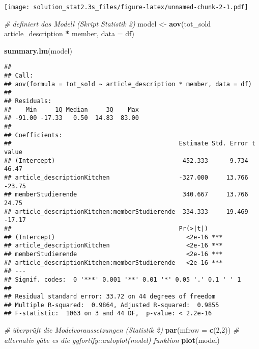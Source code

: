 \documentclass[
]{article}
\newenvironment{Shaded}{\begin{snugshade}}{\end{snugshade}}
\newcommand{\CommentTok}[1]{\textcolor[rgb]{0.56,0.35,0.01}{\textit{#1}}}
\newcommand{\DataTypeTok}[1]{\textcolor[rgb]{0.13,0.29,0.53}{#1}}
\newcommand{\DecValTok}[1]{\textcolor[rgb]{0.00,0.00,0.81}{#1}}
\newcommand{\KeywordTok}[1]{\textcolor[rgb]{0.13,0.29,0.53}{\textbf{#1}}}
\newcommand{\NormalTok}[1]{#1}
\newcommand{\OperatorTok}[1]{\textcolor[rgb]{0.81,0.36,0.00}{\textbf{#1}}}
\newcommand{\StringTok}[1]{\textcolor[rgb]{0.31,0.60,0.02}{#1}}
\begin{document}
\texttt{[image: solution\_stat2.3s\_files/figure-latex/unnamed-chunk-2-1.pdf]}

\begin{Shaded}
\begin{Highlighting}[]
\CommentTok{# definiert das Modell (Skript Statistik 2)}
\NormalTok{model <-}\StringTok{ }\KeywordTok{aov}\NormalTok{(tot_sold }\OperatorTok{~}\StringTok{ }\NormalTok{article_description }\OperatorTok{*}\StringTok{ }\NormalTok{member, }\DataTypeTok{data =}\NormalTok{ df)}

\KeywordTok{summary.lm}\NormalTok{(model)}
\end{Highlighting}
\end{Shaded}

\begin{verbatim}
## 
## Call:
## aov(formula = tot_sold ~ article_description * member, data = df)
## 
## Residuals:
##    Min     1Q Median     3Q    Max 
## -91.00 -17.33   0.50  14.83  83.00 
## 
## Coefficients:
##                                              Estimate Std. Error t value
## (Intercept)                                   452.333      9.734   46.47
## article_descriptionKitchen                   -327.000     13.766  -23.75
## memberStudierende                             340.667     13.766   24.75
## article_descriptionKitchen:memberStudierende -334.333     19.469  -17.17
##                                              Pr(>|t|)    
## (Intercept)                                    <2e-16 ***
## article_descriptionKitchen                     <2e-16 ***
## memberStudierende                              <2e-16 ***
## article_descriptionKitchen:memberStudierende   <2e-16 ***
## ---
## Signif. codes:  0 '***' 0.001 '**' 0.01 '*' 0.05 '.' 0.1 ' ' 1
## 
## Residual standard error: 33.72 on 44 degrees of freedom
## Multiple R-squared:  0.9864, Adjusted R-squared:  0.9855 
## F-statistic:  1063 on 3 and 44 DF,  p-value: < 2.2e-16
\end{verbatim}

\begin{Shaded}
\begin{Highlighting}[]
\CommentTok{# überprüft die Modelvoraussetzungen (Statistik 2)}
\KeywordTok{par}\NormalTok{(}\DataTypeTok{mfrow =} \KeywordTok{c}\NormalTok{(}\DecValTok{2}\NormalTok{,}\DecValTok{2}\NormalTok{)) }\CommentTok{# alternativ gäbe es die ggfortify::autoplot(model) funktion}
\KeywordTok{plot}\NormalTok{(model)}
\end{Highlighting}
\end{Shaded}
\end{document}
